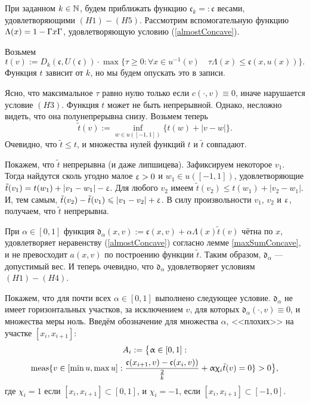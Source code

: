 При заданном $k \in \mathbb N$, будем приближать функцию $\mathfrak c_k =: \mathfrak c$ весами, удовлетворяющими $(H1)-(H5)$.
Рассмотрим вспомогательную функцию $\Lambda(x) = 1 - \abs{x}$, удовлетворяющую условию (\ref{almostConcave}).

Возьмем
$$
t(v):=D_k(\mathfrak c, U(\mathfrak c)) \cdot \max\{\tau \ge 0: \forall x \in u^{-1}(v) \quad \tau \Lambda(x) \le \mathfrak c(x, u(x))\}.
$$
Функция $t$ зависит от $k$, но мы будем опускать это в записи.

Ясно, что максимальное $\tau$ равно нулю только если $c(\cdot, v) \equiv 0$, иначе нарушается условие $(H3)$.
Функция $t$ может не быть непрерывной. Однако, несложно видеть, что она полунепрерывна снизу.
Возьмем теперь
$$
\tilde{t}(v) := \inf_{w \in u([-1, 1])} \{t(w) + |v - w|\}.
$$
Очевидно, что $\tilde{t} \le t$, и множества нулей функций $t$ и $\tilde{t}$ совпадают.

Покажем, что $\tilde{t}$ непрерывна (и даже липшицева).
Зафиксируем некоторое $v_1$.
Тогда найдутся сколь угодно малое $\upvarepsilon > 0$ и $w_1 \in u([-1, 1])$,
удовлетворяющие $\tilde{t}(v_1) = t(w_1) + |v_1 - w_1| - \upvarepsilon$.
Для любого $v_2$ имеем $\tilde{t}(v_2) \le t(w_1) + |v_2 - w_1|$.
И, тем самым, $\tilde{t}(v_2) - \tilde{t}(v_1) \leqslant |v_1 - v_2| + \upvarepsilon$.
В силу произвольности $v_1$, $v_2$ и $\upvarepsilon$, получаем, что $\tilde{t}$ непрерывна.

При $\alpha \in [0, 1]$ функция $\mathfrak d_\alpha(x, v) := \mathfrak c(x, v) + \alpha \Lambda(x) \tilde{t}(v)$
чётна по $x$, удовлетворяет неравенству (\ref{almostConcave}) согласно лемме \ref{maxSumConcave},
и не превосходит $a(x, v)$ по построению функции $\tilde{t}$.
Таким образом, $\mathfrak d_\alpha$ --- допустимый вес.
И теперь очевидно, что $\mathfrak d_\alpha$ удовлетворяет условиям $(H1)-(H4)$.

Покажем, что для почти всех $\alpha \in [0, 1]$ выполнено следующее условие.
$\mathfrak d_{\alpha}$ не имеет горизонтальных участков,
за исключением $v$, для которых $\mathfrak d_{\alpha}(\cdot, v) \equiv 0$, и множества меры ноль.
Введём обозначение для множества $\alpha$, <<плохих>> на участке $[x_i, x_{i + 1}]$:
\begin{multline*}
A_i := \bigl \{\alpha \in [0, 1]: \\
\meas \{v \in [\min u, \max u]: \frac{\mathfrak c(x_{i + 1}, v) - \mathfrak c(x_i, v))}{\frac{2}{k}} + \alpha \chi_i \tilde{t} (v) = 0 \} > 0 \bigr \},
\end{multline*}
где $\chi_i = 1$ если $[x_i, x_{i + 1}] \subset [0, 1]$, и $\chi_i = -1$, если $[x_i, x_{i + 1}] \subset [-1, 0]$.

